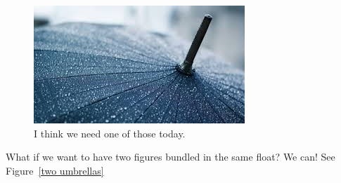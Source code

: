 \documentclass[11pt]{article}    %
\begin{document}
\begin{figure}[h] %
	\includegraphics[width=\linewidth]{rainy} %
	\caption{I think we need one of those today.}
	\label{umbrella}
\end{figure}

What if we want to have two figures bundled in the same float? We can! See Figure~\ref{two umbrellas}
\end{document}

